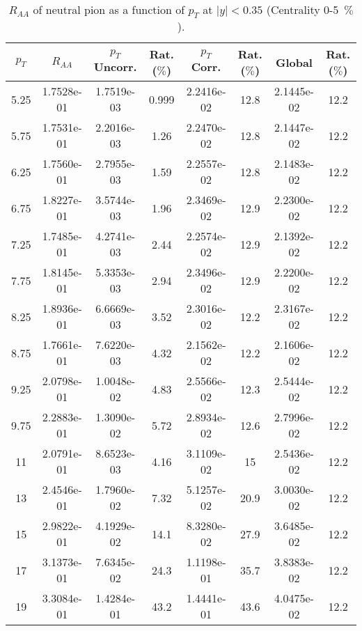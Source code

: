             
\begin{table}[!htb]
\centering
\begin{tabular}{|c|c|c|c|c|c|c|c|}
\hline
$p_{T}$ & $R_{AA}$ & $p_{T}$ Uncorr. & Rat. ($\%$) & $p_{T}$ Corr. & Rat. ($\%$) & Global & Rat. ($\%$)\\
\hline
5.25 & 1.7528e-01 & 1.7519e-03 & 0.999 & 2.2416e-02 & 12.8 & 2.1445e-02 & 12.2 \\ 
5.75 & 1.7531e-01 & 2.2016e-03 & 1.26 & 2.2470e-02 & 12.8 & 2.1447e-02 & 12.2 \\ 
6.25 & 1.7560e-01 & 2.7955e-03 & 1.59 & 2.2557e-02 & 12.8 & 2.1483e-02 & 12.2 \\ 
6.75 & 1.8227e-01 & 3.5744e-03 & 1.96 & 2.3469e-02 & 12.9 & 2.2300e-02 & 12.2 \\ 
7.25 & 1.7485e-01 & 4.2741e-03 & 2.44 & 2.2574e-02 & 12.9 & 2.1392e-02 & 12.2 \\ 
7.75 & 1.8145e-01 & 5.3353e-03 & 2.94 & 2.3496e-02 & 12.9 & 2.2200e-02 & 12.2 \\ 
8.25 & 1.8936e-01 & 6.6669e-03 & 3.52 & 2.3016e-02 & 12.2 & 2.3167e-02 & 12.2 \\ 
8.75 & 1.7661e-01 & 7.6220e-03 & 4.32 & 2.1562e-02 & 12.2 & 2.1606e-02 & 12.2 \\ 
9.25 & 2.0798e-01 & 1.0048e-02 & 4.83 & 2.5566e-02 & 12.3 & 2.5444e-02 & 12.2 \\ 
9.75 & 2.2883e-01 & 1.3090e-02 & 5.72 & 2.8934e-02 & 12.6 & 2.7996e-02 & 12.2 \\ 
11 & 2.0791e-01 & 8.6523e-03 & 4.16 & 3.1109e-02 & 15 & 2.5436e-02 & 12.2 \\ 
13 & 2.4546e-01 & 1.7960e-02 & 7.32 & 5.1257e-02 & 20.9 & 3.0030e-02 & 12.2 \\ 
15 & 2.9822e-01 & 4.1929e-02 & 14.1 & 8.3280e-02 & 27.9 & 3.6485e-02 & 12.2 \\ 
17 & 3.1373e-01 & 7.6345e-02 & 24.3 & 1.1198e-01 & 35.7 & 3.8383e-02 & 12.2 \\ 
19 & 3.3084e-01 & 1.4284e-01 & 43.2 & 1.4441e-01 & 43.6 & 4.0475e-02 & 12.2 \\ 
\hline
\end{tabular}
\caption{$R_{AA}$ of neutral pion as a function of $p_{T}$ at $|y|<0.35$ (Centrality 0-5~$\%$).}
\end{table}
            
            
